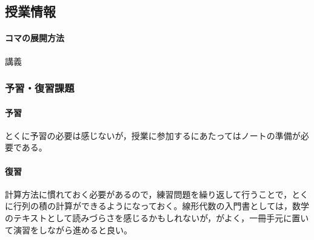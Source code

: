 \subsection{授業情報}
\paragraph{コマの展開方法}
講義
\subsubsection{予習・復習課題}
\paragraph{予習}とくに予習の必要は感じないが，授業に参加するにあたってはノートの準備が必要である。
\paragraph{復習}計算方法に慣れておく必要があるので，練習問題を繰り返して行うことで，とくに行列の積の計算ができるようになっておく。線形代数の入門書としては，数学のテキストとして読みづらさを感じるかもしれないが，\citet{Murakami20160301}がよく，一冊手元に置いて演習をしながら進めると良い。
